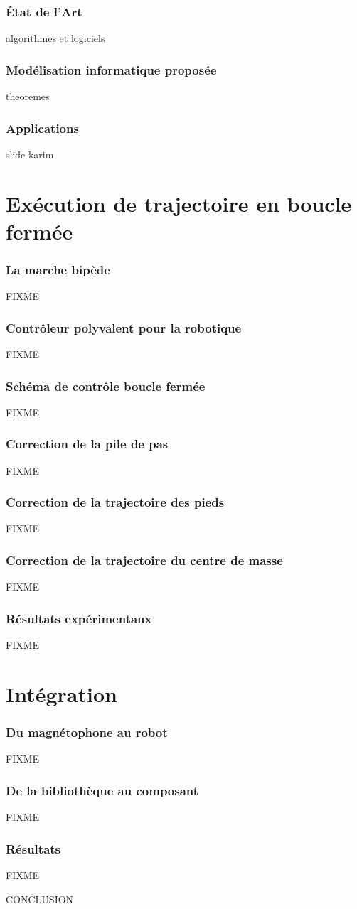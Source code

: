\documentclass[14pt,utf8x]{beamer}
\begin{document}
\begin{frame}
  \frametitle{État de l'Art}

  algorithmes et logiciels
\end{frame}

\begin{frame}
  \frametitle{Modélisation informatique proposée}

  theoremes
\end{frame}

\begin{frame}
  \frametitle{Applications}

  slide karim
\end{frame}


\section{Exécution de trajectoire en boucle fermée}

\begin{frame}
  \frametitle{La marche bipède}

  FIXME
\end{frame}

\begin{frame}
  \frametitle{Contrôleur polyvalent pour la robotique}

  FIXME
\end{frame}

\begin{frame}
  \frametitle{Schéma de contrôle boucle fermée}

  FIXME
\end{frame}

\begin{frame}
  \frametitle{Correction de la pile de pas}

  FIXME
\end{frame}

\begin{frame}
  \frametitle{Correction de la trajectoire des pieds}

  FIXME
\end{frame}

\begin{frame}
  \frametitle{Correction de la trajectoire du centre de masse}

  FIXME
\end{frame}


\begin{frame}
  \frametitle{Résultats expérimentaux}

  FIXME
\end{frame}


\section{Intégration}

\begin{frame}
  \frametitle{Du magnétophone au robot}

  FIXME
\end{frame}

\begin{frame}
  \frametitle{De la bibliothèque au composant}

  FIXME
\end{frame}

\begin{frame}
  \frametitle{Résultats}
  FIXME
\end{frame}


\begin{frame}
  CONCLUSION
\end{frame}
\end{document}
